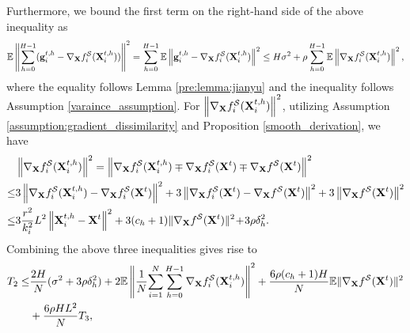 \documentclass{article} %
\theoremstyle{plain}
\theoremstyle{definition}
\begin{document}
Furthermore, we bound the first term on the right-hand side of the above inequality as
\begin{align}
    \mathbb{E}\left \|  \sum_{h=0}^{H-1} ({\bf g}^{t,h}_i -  \nabla_{\bf X} f_i^{\mathcal{S}} ({\bf X}_i^{t,h})) \right \|^2 = \sum_{h=0}^{H-1} \mathbb{E}\left \|{\bf g}^{t,h}_i -  \nabla_{\bf X} f_i^{\mathcal{S}} ({\bf X}_i^{t,h}) \right \|^2 
    \leq H \sigma^2 + \rho \sum_{h=0}^{H-1} \mathbb{E} \left \|\nabla_{\bf X} f_i^{\mathcal{S}} ({\bf X}_i^{t,h}) \right \|^2, \nonumber
\end{align}
where the equality follows Lemma \ref{pre:lemma:jianyu} and the inequality follows Assumption \ref{varaince_assumption}. 
For $\left \|\nabla_{\bf X} f_i^{\mathcal{S}} ({\bf X}_i^{t,h}) \right \|^2$, utilizing Assumption \ref{assumption:gradient_dissimilarity} and Proposition \ref{smooth_derivation}, we have
\begin{align}\label{bound_gradient_i}
& \left \|\nabla_{\bf X} f_i^{\mathcal{S}} ({\bf X}_i^{t,h}) \right \|^2 = \left \|\nabla_{\bf X} f_i^{\mathcal{S}} ({\bf X}_i^{t,h}) \mp \nabla_{\bf X} f_i^{\mathcal{S}} ({\bf X}^{t})  \mp \nabla_{\bf X} f^{\mathcal{S}} ({\bf X}^t)   \right \|^2 \nonumber \\
\leq & 3 \left \|\nabla_{\bf X} f_i^{\mathcal{S}} ({\bf X}_i^{t,h}) - \nabla_{\bf X} f_i^{\mathcal{S}} ({\bf X}^{t}) \right \|^2 + 3 \left \|\nabla_{\bf X} f_i^{\mathcal{S}} ({\bf X}^{t})  - \nabla_{\bf X} f^{\mathcal{S}} ({\bf X}^t)   \right \|^2 + 3 \left \|\nabla_{\bf X} f^{\mathcal{S}} ({\bf X}^t)   \right \|^2 \nonumber \\
\leq & 3 \frac{r^2}{k_i^2} L^2 \left \|{\bf X}_i^{t,h} - {\bf X}^{t} \right \|^2 + 3 (c_h + 1) \| \nabla_{\bf X} f^{\mathcal{S}}({\bf X}^t) \|^2  \!+\! 3 \rho \delta_h^2.
\end{align}
Combining the above three inequalities gives rise to
\begin{align}\label{T_2}
    T_2 
    \leq & \frac{2H}{N} (\sigma^2 + 3 \rho \delta_h^2) + 2\mathbb{E}\left \| \frac{1}{N} \!\sum_{i=1}^{N} \sum_{h=0}^{H-1} \nabla_{\bf X} f_i^{\mathcal{S}} ({\bf X}_i^{t,h}) \right \|^2 + \frac{6\rho (c_h + 1) H}{N} \mathbb{E} \| \nabla_{\bf X} f^{\mathcal{S}}({\bf X}^t) \|^2 \nonumber \\
    &+ \frac{6 \rho H L^2}{N} T_3,
\end{align}
\end{document}
